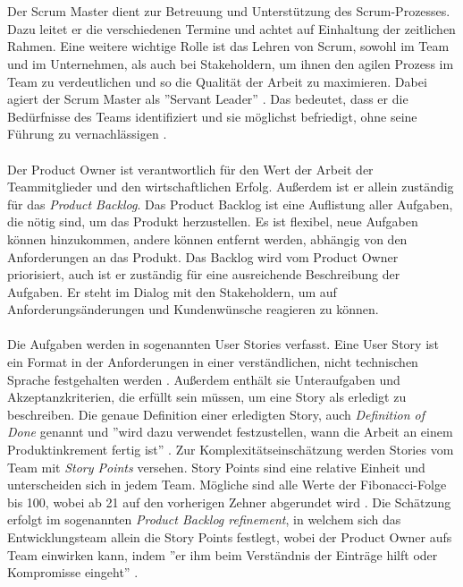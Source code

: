 \\ \\
Der Scrum Master dient zur Betreuung und Unterstützung des Scrum-Prozesses. Dazu leitet er die verschiedenen Termine und achtet auf Einhaltung der zeitlichen Rahmen. Eine weitere wichtige Rolle ist das Lehren von Scrum, sowohl im Team und im Unternehmen, als auch bei Stakeholdern, um ihnen den agilen Prozess im Team zu verdeutlichen und so die Qualität der Arbeit zu maximieren. Dabei agiert der Scrum Master als ''Servant Leader'' \cite{scrumguide}. Das bedeutet, dass er die Bedürfnisse des Teams identifiziert und sie möglichst befriedigt, ohne seine Führung zu vernachlässigen \cite{servantleadership}. 
\\ \\
Der Product Owner ist verantwortlich für den Wert der Arbeit der Teammitglieder und den wirtschaftlichen Erfolg. Außerdem ist er allein zuständig für das \textit{Product Backlog}. Das Product Backlog ist eine Auflistung aller Aufgaben, die nötig sind, um das Produkt herzustellen. Es ist flexibel, neue Aufgaben können hinzukommen, andere können entfernt werden, abhängig von den Anforderungen an das Produkt. Das Backlog wird vom Product Owner priorisiert, auch ist er zuständig für eine ausreichende Beschreibung der Aufgaben. Er steht im Dialog mit den Stakeholdern, um auf Anforderungsänderungen und Kundenwünsche reagieren zu können.
\\ \\
Die Aufgaben werden in sogenannten User Stories verfasst. Eine User Story ist ein Format in der Anforderungen in einer verständlichen, nicht technischen Sprache festgehalten werden \cite{userstoryformat}. Außerdem enthält sie Unteraufgaben und Akzeptanzkriterien, die erfüllt sein müssen, um eine Story als erledigt zu beschreiben. Die genaue Definition einer erledigten Story, auch \textit{Definition of Done} genannt und ''wird dazu verwendet festzustellen, wann die Arbeit an einem Produktinkrement fertig ist'' \cite{scrumguide}. Zur Komplexitätseinschätzung werden Stories vom Team mit \textit{Story Points} versehen. Story Points sind eine relative Einheit und unterscheiden sich in jedem Team. Mögliche sind alle Werte der Fibonacci-Folge bis 100, wobei ab 21 auf den vorherigen Zehner abgerundet wird \cite{storypoints}. Die Schätzung erfolgt im sogenannten \textit{Product Backlog refinement}, in welchem sich das Entwicklungsteam allein die Story Points festlegt, wobei der Product Owner aufs Team einwirken kann, indem ''er ihm beim Verständnis der Einträge hilft oder Kompromisse eingeht'' \cite{scrumguide}.
